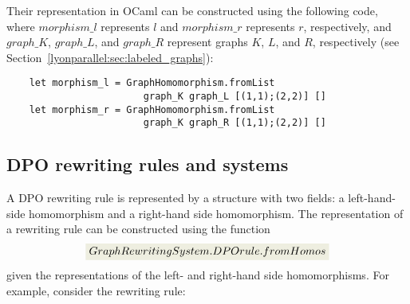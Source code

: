 \noindent Their representation in OCaml can be constructed using the following code, where \colorbox{Ivory2}{$morphism\_l$} represents $l$ and \colorbox{Ivory2}{$morphism\_r$} represents $r$, respectively, and \colorbox{Ivory2}{$graph\_K$}, \colorbox{Ivory2}{$graph\_L$}, and \colorbox{Ivory2}{$graph\_R$} represent graphs $K$, $L$, and $R$, respectively (see Section~\ref{lyonparallel:sec:labeled_graphs}):
\begin{verbatim}
    let morphism_l = GraphHomomorphism.fromList 
                        graph_K graph_L [(1,1);(2,2)] []
    let morphism_r = GraphHomomorphism.fromList
                        graph_K graph_R [(1,1);(2,2)] []
\end{verbatim}

\subsection{DPO rewriting rules and systems}
A DPO rewriting rule is represented by a structure with two fields: a left-hand-side homomorphism and a right-hand side homomorphism. The representation of a rewriting rule can be constructed using the function
 $$\colorbox{Ivory2}{$GraphRewritingSystem.DPOrule.fromHomos$}$$
given the representations of the left- and right-hand side homomorphisms.
For example, 
consider the rewriting rule:
  \begin{center}
    \end{center}
